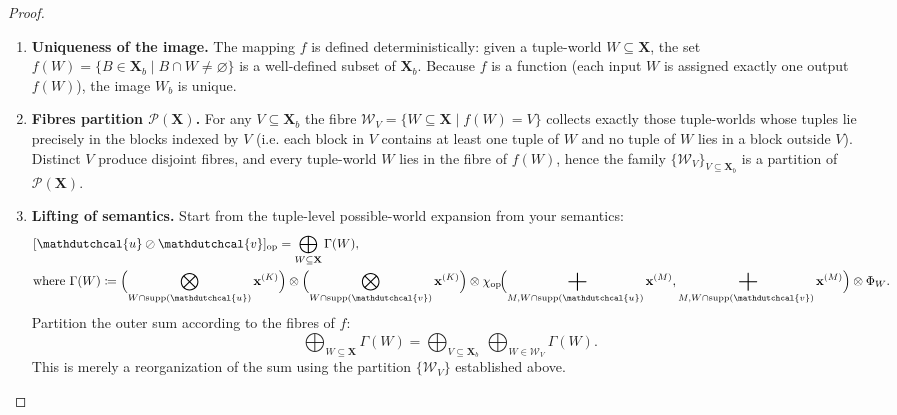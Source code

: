 \begin{proof}
\begin{enumerate}
\item \textbf{Uniqueness of the image.}
The mapping $f$ is defined deterministically: given a tuple-world $W\subseteq\mathbf{X}$,
the set $f(W)=\{B\in\mathbf{X}_b\mid B\cap W\neq\varnothing\}$ is a well-defined subset of $\mathbf{X}_b$.
Because $f$ is a function (each input $W$ is assigned exactly one output $f(W)$), the image $W_b$ is unique.

\item \textbf{Fibres partition $\mathcal{P}(\mathbf{X})$.}
For any $V\subseteq\mathbf{X}_b$ the fibre $\mathcal{W}_V=\{W\subseteq\mathbf{X}\mid f(W)=V\}$ collects exactly those tuple-worlds whose tuples lie precisely in the blocks indexed by $V$ (i.e. each block in $V$ contains at least one tuple of $W$ and no tuple of $W$ lies in a block outside $V$). Distinct $V$ produce disjoint fibres, and every tuple-world $W$ lies in the fibre of $f(W)$, hence the family $\{\mathcal{W}_V\}_{V\subseteq\mathbf{X}_b}$ is a partition of $\mathcal{P}(\mathbf{X})$.

\item \textbf{Lifting of semantics.}
Start from the tuple-level possible-world expansion from your semantics:
  \begin{align*}
  &[\mathdutchcal{u}\oslash\mathdutchcal{v}]_{\mathrm{op}}
=
\bigoplus_{W\subseteq\mathbf{X}}
  \Gamma(W),
    \\ &\text{where }\Gamma(W)
\coloneqq
  \Bigl(\bigotimes_{W\cap\mathrm{supp}(\mathdutchcal{u})}\mathbf{x}^{(K)}\Bigr)
  \otimes
  \Bigl(\bigotimes_{W\cap\mathrm{supp}(\mathdutchcal{v})}\mathbf{x}^{(K)}\Bigr)
  \otimes
  \chi_{\mathrm{op}}\!\Bigl(\bigplus_{M,W\cap\mathrm{supp}(\mathdutchcal{u})}\mathbf{x}^{(M)},
                          \bigplus_{M,W\cap\mathrm{supp}(\mathdutchcal{v})}\mathbf{x}^{(M)}\Bigr)
  \otimes
  \Phi_{W}.
\end{align*}
Partition the outer sum according to the fibres of $f$:
\[
\bigoplus_{W\subseteq\mathbf{X}} \Gamma(W)
=
\bigoplus_{V\subseteq\mathbf{X}_b}\ \bigoplus_{W\in\mathcal{W}_V} \Gamma(W).
\]
This is merely a reorganization of the sum using the partition $\{\mathcal{W}_V\}$ established above.


\end{enumerate}
\end{proof}

